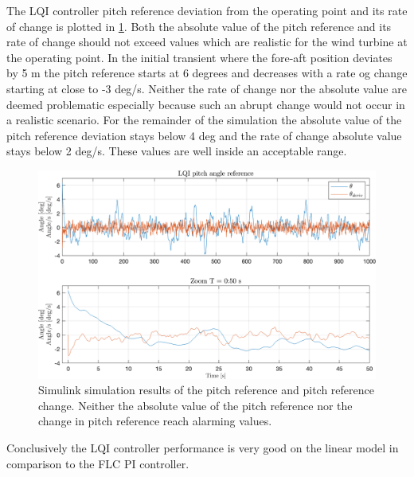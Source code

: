 The LQI controller pitch reference deviation from the operating point and its rate of change is plotted in \cref{fig:sim_10_pitch}. Both the absolute value of the pitch reference and its rate of change should not exceed values which are realistic for the wind turbine at the operating point. In the initial transient where the fore-aft position deviates by 5 m the pitch reference starts at 6 degrees and decreases with a rate og change starting at close to -3 deg/s. Neither the rate of change nor the absolute value are deemed problematic especially because such an abrupt change would not occur in a realistic scenario. For the remainder of the simulation the absolute value of the pitch reference deviation stays below 4 deg and the rate of change absolute value stays below 2 deg/s. These values are well inside an acceptable range.
\begin{figure}[ht]
	\centering
	\includegraphics[width=0.7\linewidth]{Graphics/TestResults/linearModPerf/sim_10_pitch.png}
	\caption{Simulink simulation results of the pitch reference and pitch reference change. Neither the absolute value of the pitch reference nor the change in pitch reference reach alarming values.}
	\label{fig:sim_10_pitch}
\end{figure}

Conclusively the LQI controller performance is very good on the linear model in comparison to the FLC PI controller.%


%
%
